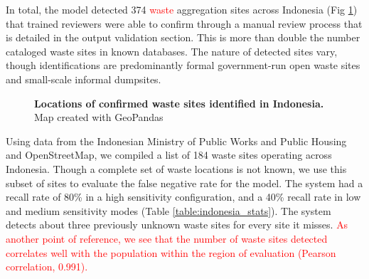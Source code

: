 \documentclass[10pt,letterpaper]{article}
\begin{document}
In total, the model detected 374 \textcolor{red}{waste} aggregation sites across Indonesia (Fig \ref{fig:indonesia_locations}) that trained reviewers were able to confirm through a manual review process that is detailed in the output validation section. This is more than double the number cataloged waste sites in known databases. The nature of detected sites vary, though identifications are predominantly formal government-run open waste sites and small-scale informal dumpsites.

\begin{figure}[!h]
    \caption{{\bf Locations of confirmed waste sites identified in Indonesia.}
    Map created with GeoPandas \cite{kelsey_jordahl_2020_3946761} \color{red}{with country boundary from provided by the Database of Global Administrative Areas.}}
    \label{fig:indonesia_locations}
\end{figure}

Using data from the Indonesian Ministry of Public Works and Public Housing \cite{astinfra} and OpenStreetMap, we compiled a list of 184 waste sites operating across Indonesia. Though a complete set of waste locations is not known, we use this subset of sites to evaluate the false negative rate for the model. The system had a recall rate of 80\% in a high sensitivity configuration, and a 40\% recall rate in low and medium sensitivity modes (Table \ref{table:indonesia_stats}). The system detects about three previously unknown waste sites for every site it misses. \textcolor{red}{As another point of reference, we see that the number of waste sites detected correlates well with the population within the region of evaluation (Pearson correlation, 0.991).}

\newcommand{\specialcell}[2][b]{%
  \begin{tabular}[#1]{@{}c@{}}#2\end{tabular}}

\newcommand{\specialcellc}[2][c]{%
  \begin{tabular}[#1]{@{}c@{}}#2\end{tabular}}
\end{document}
